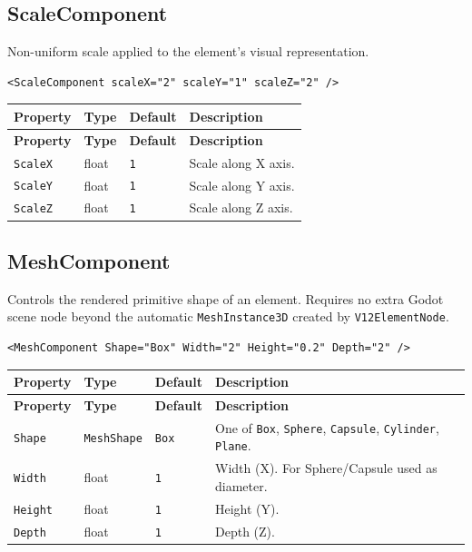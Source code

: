 \documentclass[11pt,a4paper]{article}
\begin{document}
\subsection{ScaleComponent}

Non-uniform scale applied to the element's visual representation.

\begin{lstlisting}
<ScaleComponent scaleX="2" scaleY="1" scaleZ="2" />
\end{lstlisting}

\begin{longtable}{P{3cm} P{2cm} P{2.5cm} P{5.5cm}}
  \toprule
  \textbf{Property} & \textbf{Type} & \textbf{Default} & \textbf{Description} \\
  \midrule
  \endfirsthead
  \toprule
  \textbf{Property} & \textbf{Type} & \textbf{Default} & \textbf{Description} \\
  \midrule
  \endhead
  \texttt{ScaleX} & float & \texttt{1} & Scale along X axis. \\
  \texttt{ScaleY} & float & \texttt{1} & Scale along Y axis. \\
  \texttt{ScaleZ} & float & \texttt{1} & Scale along Z axis. \\
  \bottomrule
\end{longtable}

\subsection{MeshComponent}

Controls the rendered primitive shape of an element. Requires no extra Godot
scene node beyond the automatic \texttt{MeshInstance3D} created by
\texttt{V12ElementNode}.

\begin{lstlisting}
<MeshComponent Shape="Box" Width="2" Height="0.2" Depth="2" />
\end{lstlisting}

\begin{longtable}{P{3cm} P{2cm} P{2.5cm} P{5.5cm}}
  \toprule
  \textbf{Property} & \textbf{Type} & \textbf{Default} & \textbf{Description} \\
  \midrule
  \endfirsthead
  \toprule
  \textbf{Property} & \textbf{Type} & \textbf{Default} & \textbf{Description} \\
  \midrule
  \endhead
  \texttt{Shape} & \texttt{MeshShape} & \texttt{Box} &
    One of \texttt{Box}, \texttt{Sphere}, \texttt{Capsule},
    \texttt{Cylinder}, \texttt{Plane}. \\
  \texttt{Width} & float & \texttt{1} &
    Width (X). For Sphere/Capsule used as diameter. \\
  \texttt{Height} & float & \texttt{1} & Height (Y). \\
  \texttt{Depth} & float & \texttt{1} & Depth (Z). \\
  \bottomrule
\end{longtable}
\end{document}
